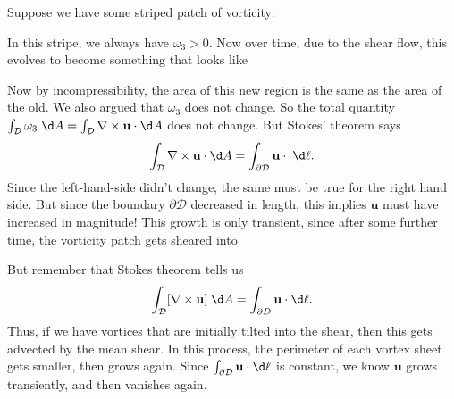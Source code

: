 \documentclass[a4paper]{article}
\begin{document}
Suppose we have some striped patch of vorticity:
\begin{center}
\end{center}
In this stripe, we always have $\omega_3 > 0$. Now over time, due to the shear flow, this evolves to become something that looks like
\begin{center}
\end{center}
Now by incompressibility, the area of this new region is the same as the area of the old. We also argued that $\omega_3$ does not change. So the total quantity $\int_\mathcal{D} \omega_3 \;\d A = \int_\mathcal{D} \nabla \times \mathbf{u} \cdot \d A$ does not change. But Stokes' theorem says
\[
  \int_{\mathcal{D}} \nabla \times \mathbf{u} \cdot \d A = \int_{\partial \mathcal{D}} \mathbf{u} \cdot \;\d \ell.
\]
Since the left-hand-side didn't change, the same must be true for the right hand side. But since the boundary $\partial \mathcal{D}$ decreased in length, this implies $\mathbf{u}$ must have increased in magnitude! This growth is only transient, since after some further time, the vorticity patch gets sheared into 
\begin{center}
\end{center}
But remember that Stokes theorem tells us
\[
  \int_\mathcal{D} [\nabla \times \mathbf{u}] \;\d A = \int_{\partial D} \mathbf{u} \cdot \d \ell.
\]
Thus, if we have vortices that are initially tilted into the shear, then this gets advected by the mean shear. In this process, the perimeter of each vortex sheet gets smaller, then grows again. Since $\int_{\partial \mathcal{D}} \mathbf{u} \cdot \d \ell$ is constant, we know $\mathbf{u}$ grows transiently, and then vanishes again.
\end{document}
